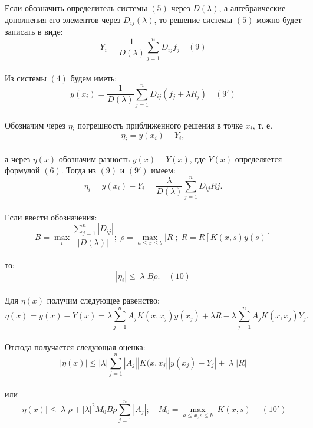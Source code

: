 \documentclass[12pt]{article}
\begin{document}
Если обозначить определитель системы $ (5) $ через $ D(\lambda) $, а алгебраические дополнения его элементов через $ D_{ij}(\lambda) $, то решение системы $ (5) $ можно будет записать в виде:\\
$$ Y_{i} = \frac{1}{D(\lambda)}\sum\limits_{j=1}^n D_{ij}f_{j} \quad (9) $$\\
Из системы $ (4) $ будем иметь: \\
$$  y(x_{i}) = \frac{1}{D(\lambda)}\sum\limits_{j=1}^n D_{ij}(f_{j} + \lambda R_{j}) \quad (9')$$\\
Обозначим через $ \eta_{i} $ погрешность приближенного решения в точке $ x_{i} $, т. е. \\
$$ \eta_{i} = y(x_{i}) - Y_{i} ,$$\\
а через $ \eta(x) $ обозначим разность $ y(x) - Y(x) $, где $ Y(x) $ определяется формулой $ (6) $. Тогда из $ (9) $ и $ (9') $ имеем: 
$$ \eta_{i} = y(x_{i}) - Y_{i} = \frac{\lambda}{D(\lambda)}\sum\limits_{j=1}^n D_{ij}Rj .$$\\
Если ввести обозначения:\\
$$ B = \max_i \frac{\sum\limits_{j=1}^n|D_{ij}|}{|D(\lambda)|}; \; \rho = \max\limits_{a\leqslant x \leqslant b}|R|; \; R = R[K(x,s)y(s)] $$\\
то:\\
$$ |\eta_{i}| \leqslant |\lambda| B\rho . \quad (10)$$ \\
Для $ \eta(x) $ получим следующее равенство: \\
$$ \eta(x) = y(x) - Y(x) = \lambda \sum\limits_{j=1}^n A_{j}K(x,x_{j})y(x_{j}) + \lambda R - \lambda \sum\limits_{j=1}^n A_{j}K(x,x_{j})Y_{j} . $$\\
Отсюда получается следующая оценка:\\
$$ |\eta(x)| \leqslant |\lambda|\sum\limits_{j=1}^n |A_{j}||K(x,x_{j}||y(x_{j}) - Y_{j}| + |\lambda||R| $$\\
или\\
$$ |\eta(x)| \leqslant |\lambda|\rho + |\lambda|^2 M_{0}B\rho \sum\limits_{j=1}^n |A_{j}|; \quad  M_{0} = \max\limits_{a \leqslant x,s \leqslant b} |K(x,s)| \quad (10') $$ \\
\end{document}

